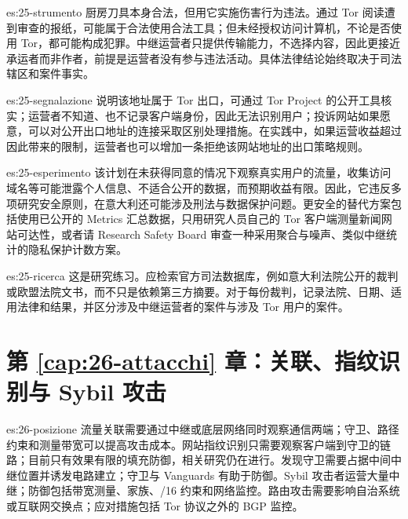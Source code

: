 \begin{soluzione}{es:25-strumento}
厨房刀具本身合法，但用它实施伤害行为违法。通过 Tor 阅读遭到审查的报纸，可能属于合法使用合法工具；但未经授权访问计算机，不论是否使用 Tor，都可能构成犯罪。中继运营者只提供传输能力，不选择内容，因此更接近承运者而非作者，前提是运营者没有参与违法活动。具体法律结论始终取决于司法辖区和案件事实。
\end{soluzione}

\begin{soluzione}{es:25-segnalazione}
说明该地址属于 Tor 出口，可通过 Tor Project 的公开工具核实；运营者不知道、也不记录客户端身份，因此无法识别用户；投诉网站如果愿意，可以对公开出口地址的连接采取区别处理措施。在实践中，如果运营收益超过因此带来的限制，运营者也可以增加一条拒绝该网站地址的出口策略规则。
\end{soluzione}

\begin{soluzione}{es:25-esperimento}
该计划在未获得同意的情况下观察真实用户的流量，收集访问域名等可能泄露个人信息、不适合公开的数据，而预期收益有限。因此，它违反多项研究安全原则，在意大利还可能涉及刑法与数据保护问题。更安全的替代方案包括使用已公开的 Metrics 汇总数据，只用研究人员自己的 Tor 客户端测量新闻网站可达性，或者请 Research Safety Board 审查一种采用聚合与噪声、类似中继统计的隐私保护计数方案。
\end{soluzione}

\begin{soluzione}{es:25-ricerca}
这是研究练习。应检索官方司法数据库，例如意大利法院公开的裁判或欧盟法院文书，而不只是依赖第三方摘要。对于每份裁判，记录法院、日期、适用法律和结果，并区分涉及中继运营者的案件与涉及 Tor 用户的案件。
\end{soluzione}

\section*{第 \ref{cap:26-attacchi} 章：关联、指纹识别与 Sybil 攻击}

\begin{soluzione}{es:26-posizione}
流量关联需要通过中继或底层网络同时观察通信两端；守卫、路径约束和测量带宽可以提高攻击成本。网站指纹识别只需要观察客户端到守卫的链路；目前只有效果有限的填充防御，相关研究仍在进行。发现守卫需要占据中间中继位置并诱发电路建立；守卫与 Vanguards 有助于防御。Sybil 攻击者运营大量中继；防御包括带宽测量、家族、/16 约束和网络监控。路由攻击需要影响自治系统或互联网交换点；应对措施包括 Tor 协议之外的 BGP 监控。
\end{soluzione}

